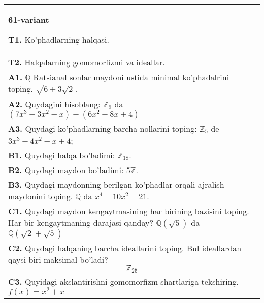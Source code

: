\documentclass{article}
\begin{document}
\begin{tabular}{m{17cm}}
\textbf{61-variant}
\newline

\textbf{T1.} Ko'phadlarning halqasi. \\
\textbf{T2.} Halqalarning gomomorfizmi va ideallar. \\
\textbf{A1.} \(\mathbb{Q}\) Ratsianal sonlar maydoni ustida minimal ko'phadalrini toping.
\(\sqrt{6 + 3\sqrt{2}}\). \\
\textbf{A2.} Quydagini hisoblang:
\(\mathbb{Z}_{9}\) da \(\left( 7x^{3} + 3x^{2} - x \right) + \left( 6x^{2} - 8x + 4 \right)\) \\
\textbf{A3.} Quydagi ko'phadlarning barcha nollarini toping:
\(\mathbb{Z}_{5}\) de \(3x^{3} - 4x^{2} - x + 4\); \\
\textbf{B1.} Quydagi halqa bo'ladimi:
\(\mathbb{Z}_{18}\). \\
\textbf{B2.} Quydagi maydon bo'ladimi:
\(5\mathbb{Z}\). \\
\textbf{B3.} Quydagi maydonning berilgan ko'phadlar orqali ajralish maydonini toping.
\(\mathbb{Q}\) da \(x^{4} - 10x^{2} + 21\). \\
\textbf{C1.} Quydagi maydon kengaytmasining har birining bazisini toping. Har bir kengaytmaning darajasi qanday?
\(\mathbb{Q}\left( \sqrt{5} \right)\) da \(\mathbb{Q}\left( \sqrt{2} + \sqrt{5} \right)\) \\
\textbf{C2.} Quydagi halqaning barcha ideallarini toping. Bul ideallardan qaysi-biri maksimal bo'ladi?
\[\mathbb{Z}_{25}\] \\
\textbf{C3.} Quyidagi akslantirishni gomomorfizm shartlariga tekshiring. \(f(x) = x^{2} + x\) \\

\end{tabular}
\vspace{1cm}
\end{document}
